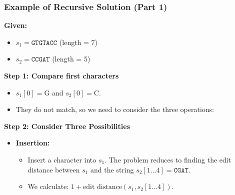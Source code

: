 \documentclass[10pt,aspectratio=43]{beamer}
\begin{document}
\begin{frame}
    \frametitle{Example of Recursive Solution (Part 1)}

    \textbf{Given:}
    \begin{itemize}
        \item $s_1 = \texttt{GTGTACC}$ (length = 7)
        \item $s_2 = \texttt{CCGAT}$ (length = 5)
    \end{itemize}

    \vspace{0.3cm}

    \textbf{Step 1: Compare first characters}
    \begin{itemize}
        \item $s_1[0] = \text{G}$ and $s_2[0] = \text{C}$.
        \item They do not match, so we need to consider the three operations:
    \end{itemize}

    \vspace{0.3cm}

    \textbf{Step 2: Consider Three Possibilities}
    \begin{itemize}
        \item \textbf{Insertion:} 
        \begin{itemize}
            \item Insert a character into $s_1$. The problem reduces to finding the edit distance between $s_1$ and the string $s_2[1 \ldots 4] = \texttt{CGAT}$.
            \item We calculate: $1 + \text{edit distance}(s_1, s_2[1 \ldots 4])$.
        \end{itemize}
    \end{itemize}
\end{frame}
\end{document}
